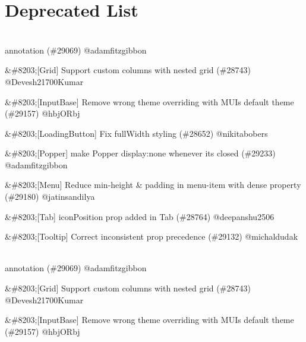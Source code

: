 \chapter{Deprecated List }
\hypertarget{deprecated}{}\label{deprecated}

\begin{DoxyRefList}
\item[Page \doxylink{md__c_1_2_users_2saket_2_one_drive_2_desktop_2e_pathshala_2epathshala-_web_2node__modules_2_0dmud542867c027665d93dd767a2c4f68d5b}{Versions} ]\hfill \\
\label{deprecated__deprecated000001}%
%
annotation (\#29069) @adamfitzgibbon
\begin{DoxyItemize}
\item \&\#8203;\mbox{[}Grid\mbox{]} Support custom columns with nested grid (\#28743) @\+Devesh21700\+Kumar
\item \&\#8203;\mbox{[}Input\+Base\mbox{]} Remove wrong theme overriding with MUI\textquotesingle{}s default theme (\#29157) @hbj\+ORbj
\item \&\#8203;\mbox{[}Loading\+Button\mbox{]} Fix {\ttfamily full\+Width} styling (\#28652) @nikitabobers
\item \&\#8203;\mbox{[}Popper\mbox{]} make Popper display\+:none whenever it\textquotesingle{}s closed (\#29233) @adamfitzgibbon
\item \&\#8203;\mbox{[}Menu\mbox{]} Reduce min-\/height \& padding in menu-\/item with dense property (\#29180) @jatinsandilya
\item \&\#8203;\mbox{[}Tab\mbox{]} {\ttfamily icon\+Position} prop added in Tab (\#28764) @deepanshu2506
\item \&\#8203;\mbox{[}Tooltip\mbox{]} Correct inconsistent prop precedence (\#29132) @michaldudak
\end{DoxyItemize}
\item[Page \doxylink{md__c_1_2_users_2saket_2_one_drive_2_desktop_2e_pathshala_2epathshala-_web_2node__modules_2_0dmui_2material_2_c_h_a_n_g_e_l_o_g}{Versions} ]\hfill \\
\label{deprecated__deprecated000002}%
%
annotation (\#29069) @adamfitzgibbon
\begin{DoxyItemize}
\item \&\#8203;\mbox{[}Grid\mbox{]} Support custom columns with nested grid (\#28743) @\+Devesh21700\+Kumar
\item \&\#8203;\mbox{[}Input\+Base\mbox{]} Remove wrong theme overriding with MUI\textquotesingle{}s default theme (\#29157) @hbj\+ORbj

\end{DoxyItemize}
\end{DoxyRefList}
